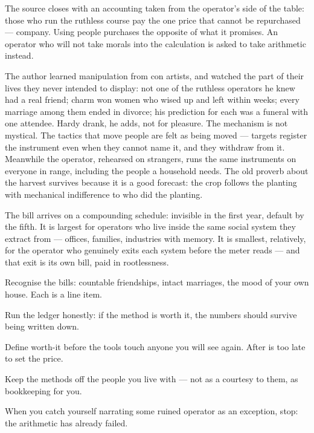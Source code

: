 \begin{core}
The source closes with an accounting taken from the operator's side of the table: those who run the ruthless course pay the one price that cannot be repurchased --- company. Using people purchases the opposite of what it promises. An operator who will not take morals into the calculation is asked to take arithmetic instead.
\end{core}
\begin{mechanism}
The author learned manipulation from con artists, and watched the part of their lives they never intended to display: not one of the ruthless operators he knew had a real friend; charm won women who wised up and left within weeks; every marriage among them ended in divorce; his prediction for each was a funeral with one attendee. Hardy drank, he adds, not for pleasure. The mechanism is not mystical. The tactics that move people are felt as being moved --- targets register the instrument even when they cannot name it, and they withdraw from it. Meanwhile the operator, rehearsed on strangers, runs the same instruments on everyone in range, including the people a household needs. The old proverb about the harvest survives because it is a good forecast: the crop follows the planting with mechanical indifference to who did the planting.
\end{mechanism}
\begin{conditions}
The bill arrives on a compounding schedule: invisible in the first year, default by the fifth. It is largest for operators who live inside the same social system they extract from --- offices, families, industries with memory. It is smallest, relatively, for the operator who genuinely exits each system before the meter reads --- and that exit is its own bill, paid in rootlessness.
\end{conditions}
\begin{application}
  \item Recognise the bills: countable friendships, intact marriages, the mood of your own house. Each is a line item.
  \item Run the ledger honestly: if the method is worth it, the numbers should survive being written down.
  \item Define worth-it before the tools touch anyone you will see again. After is too late to set the price.
  \item Keep the methods off the people you live with --- not as a courtesy to them, as bookkeeping for you.
  \item When you catch yourself narrating some ruined operator as an exception, stop: the arithmetic has already failed.
\end{application}
